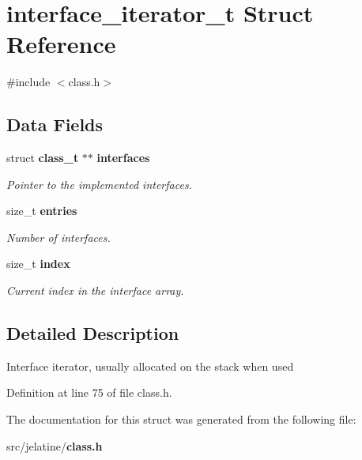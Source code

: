 \section{interface\_\-iterator\_\-t Struct Reference}
\label{structinterface__iterator__t}


{\ttfamily \#include $<$class.h$>$}

\subsection*{Data Fields}
\begin{DoxyCompactItemize}
\item 
struct {\bf class\_\-t} $\ast$$\ast$ {\bf interfaces}\label{structinterface__iterator__t_a9f8d91d909c0b1b7cf0faf4a13a37054}

\begin{DoxyCompactList}\small\item\em Pointer to the implemented interfaces. \item\end{DoxyCompactList}\item 
size\_\-t {\bf entries}\label{structinterface__iterator__t_aa48c8225b619ca85371f8f2124235ba7}

\begin{DoxyCompactList}\small\item\em Number of interfaces. \item\end{DoxyCompactList}\item 
size\_\-t {\bf index}\label{structinterface__iterator__t_a39415fd654efb0f46337efb2676d164d}

\begin{DoxyCompactList}\small\item\em Current index in the interface array. \item\end{DoxyCompactList}\end{DoxyCompactItemize}


\subsection{Detailed Description}
Interface iterator, usually allocated on the stack when used 

Definition at line 75 of file class.h.



The documentation for this struct was generated from the following file:\begin{DoxyCompactItemize}
\item 
src/jelatine/{\bf class.h}\end{DoxyCompactItemize}
